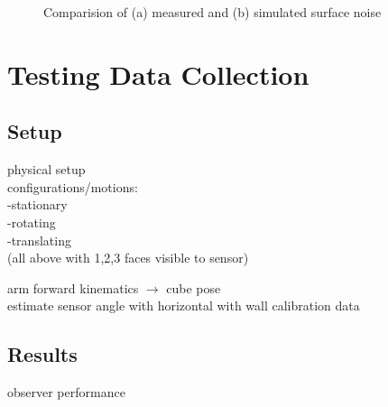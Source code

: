 \begin{figure}
{\begin{minipage}[b]{0.45\columnwidth}
 			\end{minipage}}
	  		\caption{Comparision of (a) measured and (b) simulated surface noise}
	  		\label{fig:surface_noise}
		\end{figure}

\section{Testing Data Collection}
	\subsection{Setup}
		physical setup\\
		configurations/motions: \\
			-stationary\\
			-rotating\\
			-translating\\
			(all above with 1,2,3 faces visible to sensor)
					
		arm forward kinematics $\rightarrow$ cube pose\\
		estimate sensor angle with horizontal with wall calibration data		
		
	\subsection{Results}
		observer performance

